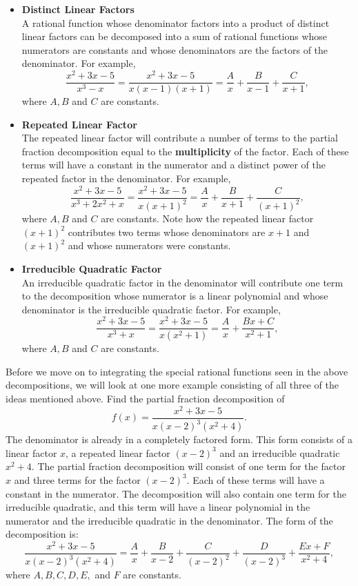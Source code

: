 \documentclass{ximera}
\begin{document}
\begin{itemize}

\item{\textbf{Distinct Linear Factors}} \\
A rational function whose denominator factors into a product of distinct linear factors
can be decomposed into a sum of rational functions whose numerators are constants and whose denominators are the factors of the denominator.
For example, 
\[
\frac{x^2 + 3x -5}{x^3 -x} = \frac{x^2 + 3x -5}{x(x-1)(x+1)} = \frac{A}{x} + \frac{B}{x-1} + \frac{C}{x+1},
\]
where $A, B$ and $C$ are constants.




\item{\textbf{Repeated Linear Factor}} \\
The repeated linear factor will contribute a number of terms to the partial fraction 
decomposition equal to the \textbf{multiplicity} of the factor. Each of these terms will have a constant in the numerator and a 
distinct power of the repeated factor in the denominator.
For example, 
\[
\frac{x^2 + 3x -5}{x^3 + 2x^2 + x} = \frac{x^2 + 3x -5}{x(x+1)^2} = \frac{A}{x} + \frac{B}{x+1} + \frac{C}{(x+1)^2},
\]
where $A, B$ and $C$ are constants. Note how the repeated linear factor $(x+1)^2$ contributes two terms whose denominators are $x+1$ and $(x+1)^2$
and whose numerators were constants.


\item{\textbf{Irreducible Quadratic Factor}} \\
An irreducible quadratic factor in the denominator will contribute one term to the decomposition whose numerator
is a linear polynomial and whose denominator is the irreducible quadratic factor.
For example, 
\[
\frac{x^2 + 3x -5}{x^3 +x} = \frac{x^2 + 3x -5}{x(x^2+1)} = \frac{A}{x} + \frac{Bx + C}{x^2 + 1},
\]
where $A, B$ and $C$ are constants.


\end{itemize}

Before we move on to integrating the special rational functions seen in the above decompositions, 
we will look at one more example consisting of all three of the ideas mentioned above.
Find the partial fraction decomposition of
\[
  f(x) = \frac{x^2 + 3x -5}{x(x-2)^3(x^2 + 4)}. 
\]
The denominator is already in a completely factored form.  This form consists of a linear factor $x$, 
a repeated linear factor $(x-2)^3$ and an irreducible quadratic $x^2 + 4$. 
The partial fraction decomposition will consist of one term for the factor $x$ and three terms for the factor
$(x-2)^3$.  Each of these terms will have a constant in the numerator.  
The decomposition will also contain one term for the irreducible quadratic, and this term 
will have a linear polynomial in the numerator and the irreducible quadratic in the denominator.
The form of the decomposition is:
\[
  \frac{x^2 + 3x -5}{x(x-2)^3(x^2 + 4)} = \frac{A}{x} + \frac{B}{x-2} + \frac{C}{(x-2)^2} + \frac{D}{(x-2)^3} +\frac{Ex+F}{x^2+4},
\]
where $A, B, C, D, E,$ and $F$ are constants.
\end{document}
